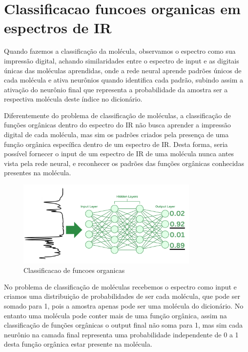 \documentclass[11pt,a4paper]{article}
\begin{document}
\section{Classificacao funcoes organicas em espectros de IR}

Quando fazemos a classificação da molécula, observamos o espectro como sua impressão digital, achando similaridades entre o espectro de input e as digitais únicas das moléculas aprendidas, onde a rede neural aprende padrões únicos de cada molécula e ativa neurônios quando identifica cada padrão, subindo assim a ativação do neurônio final que representa a probabilidade da amostra ser a respectiva molécula deste índice no dicionário.

Diferentemente do problema de classificação de moléculas, a classificação de funções orgânicas dentro do espectro do IR não busca aprender a impressão digital de cada molécula, mas sim os padrões criados pela presença de uma função orgânica específica dentro de um espectro de IR. Desta forma, seria possível fornecer o input de um espectro de IR de uma molécula nunca antes vista pela rede neural, e reconhecer os padrões das funções orgânicas conhecidas presentes na molécula.

\begin{figure}[h]
    \centering
    \includegraphics[width=0.8\textwidth]{Images/N2.png}
    \caption{Classificacao de funcoes organicas}
    \label{fig:ir_spectrum}
\end{figure}


No problema de classificação  de moléculas recebemos o espectro como input e criamos uma distribuição de probabilidades de ser cada molécula, que pode ser somado para 1, pois a amostra apenas pode ser uma molécula do dicionário. No entanto uma molécula pode conter mais de uma função orgânica, assim na classificação de funções orgânicas  o output final não soma para 1, mas sim cada neurônio na camada final representa uma probabilidade independente de 0 a 1 desta função orgânica estar presente na molécula. 
\end{document}
